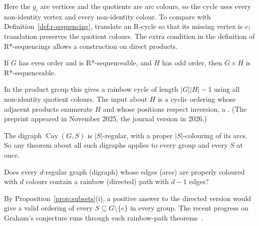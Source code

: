 Here the $g_i$ are vertices and the quotients are arc colours, so the cycle uses every non-identity vertex and every non-identity colour. To compare with Definition~\ref{def:r-sequencing}, translate an R-cycle so that its missing vertex is $e$; translation preserves the quotient colours. The extra condition in the definition of R*-sequencings allows a construction on direct products.

\begin{theorem}\label{thm:javaheri}
If $G$ has even order and is R*-sequenceable, and $H$ has odd order, then $G\times H$ is R*-sequenceable.
\end{theorem}

In the product group this gives a rainbow cycle of length $|G||H|-1$ using all non-identity quotient colours. The input about $H$ is a cyclic ordering whose adjacent products enumerate $H$ and whose positions respect inversion, a . (The preprint appeared in November 2025, the journal version in 2026.)


The digraph $\operatorname{Cay}(G,S)$ is $|S|$-regular, with a proper $|S|$-colouring of its arcs. So any theorem about all such digraphs applies to every group and every $S$ at once.

\begin{problem}\label{prob:schrijver}
Does every $d$-regular graph (digraph) whose edges (arcs) are properly coloured with $d$ colours contain a rainbow (directed) path with $d-1$ edges?
\end{problem}

By Proposition~\ref{prop:subsets}(i), a positive answer to the directed version would give a valid ordering of every $S\subseteq G\setminus\{e\}$ in every group. The recent progress on Graham's conjecture runs through such rainbow-path theorems~\cite{bfmpy25}.
